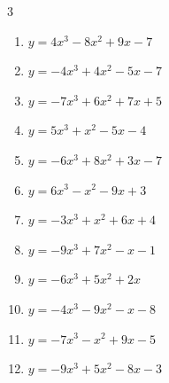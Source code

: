 \begin{multicols}{3}
\begin{enumerate}
\columnbreak %

\resetques

  \item $y=4x^{3}-8x^{2}+9x-7$


  \item $y=-4x^{3}+4x^{2}-5x-7$


  \item $y=-7x^{3}+6x^{2}+7x+5$


  \item $y=5x^{3}+x^{2}-5x-4$


  \item $y=-6x^{3}+8x^{2}+3x-7$


  \item $y=6x^{3}-x^{2}-9x+3$


  \item $y=-3x^{3}+x^{2}+6x+4$


  \item $y=-9x^{3}+7x^{2}-x-1$


  \item $y=-6x^{3}+5x^{2}+2x$


  \item $y=-4x^{3}-9x^{2}-x-8$


  \item $y=-7x^{3}-x^{2}+9x-5$


  \item $y=-9x^{3}+5x^{2}-8x-3$



\end{enumerate}
\end{multicols}
